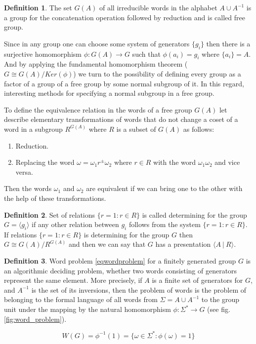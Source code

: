 \documentclass[conference]{IEEEtran}
\theoremstyle{definition}
\newtheorem{defn}{Definition}[section]
\begin{document}
\begin{defn}
The set $G(A)$ of all irreducible words in the alphabet $A \cup A^{-1}$ 
is a group for the concatenation operation followed by reduction and is called free group. 
\end{defn}

Since in any group one can choose some system of generators $\{ g_i \}$ then there 
is a surjective homomorphism $\phi: G(A) \to G$ such that $\phi(a_i) = g_i$ 
where $\{a_i\} = A$. And by applying the fundamental homomorphism theorem 
($G \cong G(A)/Ker(\phi)$) we turn to the possibility of defining every group
as a factor of a group of a free group by some normal subgroup of it. 
In this regard, interesting methods for specifying a normal subgroup in a free group.

To define the equivalence relation in the words of a free group $G(A)$
let describe elementary transformations of words that do not change 
a coset of a word in a subgroup $R^{G(A)}$ where $R$ is a subset of $G(A)$ as follows:
\begin{enumerate}
\item Reduction.
\item Replacing the word $\omega = \omega_1 r^{\pm} \omega_2$ where $r \in R$ with the word $\omega_1 \omega_2$ and vice versa.
\end{enumerate}
Then the words $\omega_1$ and $\omega_2$ are equivalent if we can bring one to 
the other with the help of these transformations.

\begin{defn}
Set of relations $\{ r=1: r \in R \}$ is called determining for the group 
$G= \langle g_i \rangle$ if any other relation between 
$g_i$ follows from the system $\{ r=1 : r \in R \}$. If relations 
$\{ r=1 : r \in R \}$ is determining for the group $G$ then $G \cong G(A)/R^{G(A)}$ 
and then we can say that $G$ has a presentation $\langle A ~|~ R \rangle$.
\end{defn}

\begin{defn}
Word problem \eqref{eqwordproblem} for a finitely generated group  $G$ is an algorithmic deciding problem,
whether two words consisting of generators represent the same element. 
More precisely, if $ A $ is a finite set of generators for $G$, and $A^{-1}$
is the set of its inversions, then the problem of words is the problem of belonging 
to the formal language of all words from $\Sigma = A \cup A ^{-1}$ 
to the group unit under the mapping by the natural homomorphism $ \phi: \Sigma ^ * \to G $ (see fig. \ref{fig:word_problem}).
\end{defn}
\begin{equation}
    W (G) = \phi ^ {- 1} (1) = \{ \omega \in \Sigma ^ *: \phi (\omega) = 1 \} \label{eqwordproblem}
\end{equation}
\end{document}
